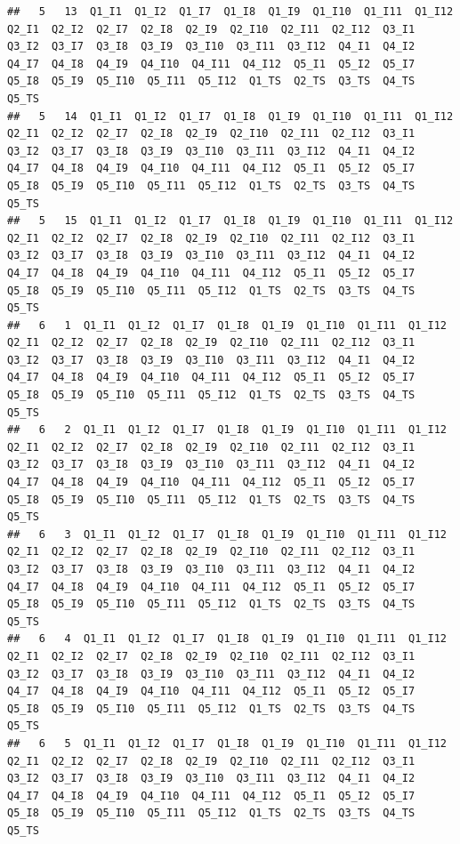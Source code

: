 \documentclass[]{book}
\begin{document}
\begin{verbatim}
##   5   13  Q1_I1  Q1_I2  Q1_I7  Q1_I8  Q1_I9  Q1_I10  Q1_I11  Q1_I12  Q2_I1  Q2_I2  Q2_I7  Q2_I8  Q2_I9  Q2_I10  Q2_I11  Q2_I12  Q3_I1  Q3_I2  Q3_I7  Q3_I8  Q3_I9  Q3_I10  Q3_I11  Q3_I12  Q4_I1  Q4_I2  Q4_I7  Q4_I8  Q4_I9  Q4_I10  Q4_I11  Q4_I12  Q5_I1  Q5_I2  Q5_I7  Q5_I8  Q5_I9  Q5_I10  Q5_I11  Q5_I12  Q1_TS  Q2_TS  Q3_TS  Q4_TS  Q5_TS
##   5   14  Q1_I1  Q1_I2  Q1_I7  Q1_I8  Q1_I9  Q1_I10  Q1_I11  Q1_I12  Q2_I1  Q2_I2  Q2_I7  Q2_I8  Q2_I9  Q2_I10  Q2_I11  Q2_I12  Q3_I1  Q3_I2  Q3_I7  Q3_I8  Q3_I9  Q3_I10  Q3_I11  Q3_I12  Q4_I1  Q4_I2  Q4_I7  Q4_I8  Q4_I9  Q4_I10  Q4_I11  Q4_I12  Q5_I1  Q5_I2  Q5_I7  Q5_I8  Q5_I9  Q5_I10  Q5_I11  Q5_I12  Q1_TS  Q2_TS  Q3_TS  Q4_TS  Q5_TS
##   5   15  Q1_I1  Q1_I2  Q1_I7  Q1_I8  Q1_I9  Q1_I10  Q1_I11  Q1_I12  Q2_I1  Q2_I2  Q2_I7  Q2_I8  Q2_I9  Q2_I10  Q2_I11  Q2_I12  Q3_I1  Q3_I2  Q3_I7  Q3_I8  Q3_I9  Q3_I10  Q3_I11  Q3_I12  Q4_I1  Q4_I2  Q4_I7  Q4_I8  Q4_I9  Q4_I10  Q4_I11  Q4_I12  Q5_I1  Q5_I2  Q5_I7  Q5_I8  Q5_I9  Q5_I10  Q5_I11  Q5_I12  Q1_TS  Q2_TS  Q3_TS  Q4_TS  Q5_TS
##   6   1  Q1_I1  Q1_I2  Q1_I7  Q1_I8  Q1_I9  Q1_I10  Q1_I11  Q1_I12  Q2_I1  Q2_I2  Q2_I7  Q2_I8  Q2_I9  Q2_I10  Q2_I11  Q2_I12  Q3_I1  Q3_I2  Q3_I7  Q3_I8  Q3_I9  Q3_I10  Q3_I11  Q3_I12  Q4_I1  Q4_I2  Q4_I7  Q4_I8  Q4_I9  Q4_I10  Q4_I11  Q4_I12  Q5_I1  Q5_I2  Q5_I7  Q5_I8  Q5_I9  Q5_I10  Q5_I11  Q5_I12  Q1_TS  Q2_TS  Q3_TS  Q4_TS  Q5_TS
##   6   2  Q1_I1  Q1_I2  Q1_I7  Q1_I8  Q1_I9  Q1_I10  Q1_I11  Q1_I12  Q2_I1  Q2_I2  Q2_I7  Q2_I8  Q2_I9  Q2_I10  Q2_I11  Q2_I12  Q3_I1  Q3_I2  Q3_I7  Q3_I8  Q3_I9  Q3_I10  Q3_I11  Q3_I12  Q4_I1  Q4_I2  Q4_I7  Q4_I8  Q4_I9  Q4_I10  Q4_I11  Q4_I12  Q5_I1  Q5_I2  Q5_I7  Q5_I8  Q5_I9  Q5_I10  Q5_I11  Q5_I12  Q1_TS  Q2_TS  Q3_TS  Q4_TS  Q5_TS
##   6   3  Q1_I1  Q1_I2  Q1_I7  Q1_I8  Q1_I9  Q1_I10  Q1_I11  Q1_I12  Q2_I1  Q2_I2  Q2_I7  Q2_I8  Q2_I9  Q2_I10  Q2_I11  Q2_I12  Q3_I1  Q3_I2  Q3_I7  Q3_I8  Q3_I9  Q3_I10  Q3_I11  Q3_I12  Q4_I1  Q4_I2  Q4_I7  Q4_I8  Q4_I9  Q4_I10  Q4_I11  Q4_I12  Q5_I1  Q5_I2  Q5_I7  Q5_I8  Q5_I9  Q5_I10  Q5_I11  Q5_I12  Q1_TS  Q2_TS  Q3_TS  Q4_TS  Q5_TS
##   6   4  Q1_I1  Q1_I2  Q1_I7  Q1_I8  Q1_I9  Q1_I10  Q1_I11  Q1_I12  Q2_I1  Q2_I2  Q2_I7  Q2_I8  Q2_I9  Q2_I10  Q2_I11  Q2_I12  Q3_I1  Q3_I2  Q3_I7  Q3_I8  Q3_I9  Q3_I10  Q3_I11  Q3_I12  Q4_I1  Q4_I2  Q4_I7  Q4_I8  Q4_I9  Q4_I10  Q4_I11  Q4_I12  Q5_I1  Q5_I2  Q5_I7  Q5_I8  Q5_I9  Q5_I10  Q5_I11  Q5_I12  Q1_TS  Q2_TS  Q3_TS  Q4_TS  Q5_TS
##   6   5  Q1_I1  Q1_I2  Q1_I7  Q1_I8  Q1_I9  Q1_I10  Q1_I11  Q1_I12  Q2_I1  Q2_I2  Q2_I7  Q2_I8  Q2_I9  Q2_I10  Q2_I11  Q2_I12  Q3_I1  Q3_I2  Q3_I7  Q3_I8  Q3_I9  Q3_I10  Q3_I11  Q3_I12  Q4_I1  Q4_I2  Q4_I7  Q4_I8  Q4_I9  Q4_I10  Q4_I11  Q4_I12  Q5_I1  Q5_I2  Q5_I7  Q5_I8  Q5_I9  Q5_I10  Q5_I11  Q5_I12  Q1_TS  Q2_TS  Q3_TS  Q4_TS  Q5_TS

\end{verbatim}
\end{document}
